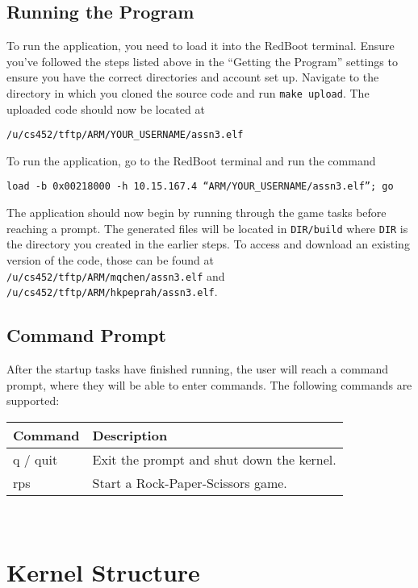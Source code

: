 \documentclass[12pt]{article}
\begin{document}
\subsection{Running the Program}
To run the application, you need to load it into the RedBoot terminal.  Ensure you've followed the steps listed above in the ``Getting the Program'' settings to ensure you have the correct directories and account set up.  Navigate to the directory in which you cloned the source code and run \texttt{make upload}.  The uploaded code should now be located at
\begin{center}
  \texttt{/u/cs452/tftp/ARM/YOUR\_USERNAME/assn3.elf}
\end{center}
To run the application, go to the RedBoot terminal and run the command
\begin{center}
  \texttt{load -b 0x00218000 -h 10.15.167.4 ``ARM/YOUR\_USERNAME/assn3.elf''; go}
\end{center}
The application should now begin by running through the game tasks before reaching a prompt.  The generated files will be located in \texttt{DIR/build} where \texttt{DIR} is the directory you created in the earlier steps.  To access and download an existing version of the code, those can be found at \texttt{/u/cs452/tftp/ARM/mqchen/assn3.elf} and \texttt{/u/cs452/tftp/ARM/hkpeprah/assn3.elf}.
\\[1\baselineskip]

\subsection{Command Prompt}
After the startup tasks have finished running, the user will reach a command prompt, where they will be able to enter commands.  The following commands are supported:
\begin{center}
  \begin{tabular}{|l|l|}
    \hline
    {\bf Command } & {\bf Description} \\\hline
    q / quit & Exit the prompt and shut down the kernel. \\\hline
    rps & Start a Rock-Paper-Scissors game. \\\hline
  \end{tabular}
  \\[2\baselineskip]
\end{center}

\section{Kernel Structure}
\end{document}
